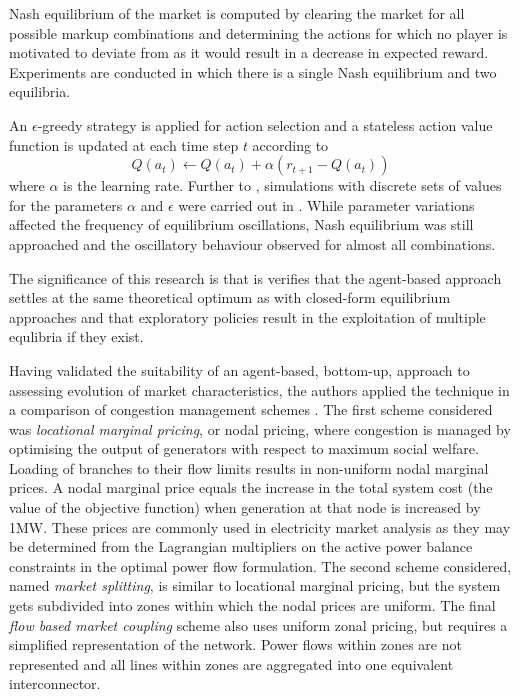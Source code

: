 Nash equilibrium of the market is computed by clearing the market for all
possible markup combinations and determining the actions for which no player is
motivated to deviate from as it would result in a decrease in expected reward.
Experiments are conducted in which there is a single Nash equilibrium and two
equilibria.

An $\epsilon$-greedy strategy is applied for action selection and a stateless
action value function is updated at each time step $t$ according to
\begin{equation}
Q(a_t) \leftarrow Q(a_t) + \alpha(r_{t+1} - Q(a_t))
\end{equation}
where $\alpha$ is the learning rate.  Further to \cite{krause:nash04},
simulations with discrete sets of values for the parameters $\alpha$ and
$\epsilon$ were carried out in \cite{krause:nash06}.  While parameter
variations affected the frequency of equilibrium oscillations, Nash equilibrium
was still approached and the oscillatory behaviour observed for almost all
combinations.

The significance of this research is that is verifies that the agent-based
approach settles at the same theoretical optimum as with closed-form equilibrium
approaches and that exploratory policies result in the exploitation of multiple
equlibria if they exist.


Having validated the suitability of an agent-based, bottom-up, approach to
assessing evolution of market characteristics, the authors applied the technique
in a comparison of congestion management schemes \cite{krause:cong}.  The first
scheme considered was \textit{locational marginal pricing}, or nodal pricing,
where congestion is managed by optimising the output of generators with respect to
maximum social welfare.  Loading of branches to their flow limits results in
non-uniform nodal marginal prices.  A nodal marginal price equals the
increase in the total system cost (the value of the objective function) when
generation at that node is increased by 1MW.  These prices are commonly used in
electricity market analysis as they may be determined from the Lagrangian
multipliers on the active power balance constraints in the optimal power flow
formulation.  The second scheme considered, named \textit{market splitting}, is
similar to locational marginal pricing, but the system gets subdivided into
zones within which the nodal prices are uniform.  The final \textit{flow based
market coupling} scheme also uses uniform zonal pricing, but requires a
simplified representation of the network.  Power flows within zones are not
represented and all lines within zones are aggregated into one equivalent
interconnector.

